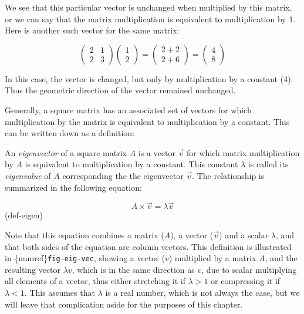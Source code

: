 \documentclass[
  letterpaper,
  DIV=11,
  numbers=noendperiod]{scrreprt}
\begin{document}
We see that this particular vector is unchanged when multiplied by this
matrix, or we can say that the matrix multiplication is equivalent to
multiplication by 1. Here is another such vector for the same matrix:

\[
\left(\begin{array}{cc}2 & 1 \\ 2& 3\end{array}\right)\left(\begin{array}{c}1 \\ 2 \end{array}\right) = \left(\begin{array}{c}2 +2 \\ 2 + 6 \end{array}\right) =  \left(\begin{array}{c} 4 \\ 8 \end{array}\right)
\]

In this case, the vector is changed, but only by multiplication by a
constant (4). Thus the geometric direction of the vector remained
unchanged.

Generally, a square matrix has an associated set of vectors for which
multiplication by the matrix is equivalent to multiplication by a
constant. This can be written down as a definition:

\begin{tcolorbox}[enhanced jigsaw, colbacktitle=quarto-callout-note-color!10!white, leftrule=.75mm, coltitle=black, left=2mm, breakable, opacityback=0, colback=white, toprule=.15mm, opacitybacktitle=0.6, bottomtitle=1mm, colframe=quarto-callout-note-color-frame, rightrule=.15mm, bottomrule=.15mm, toptitle=1mm, titlerule=0mm, arc=.35mm, title=\textcolor{quarto-callout-note-color}{\faInfo}\hspace{0.5em}{Definition}]
An \emph{eigenvector} of a square matrix \(A\) is a vector \(\vec v\)
for which matrix multiplication by \(A\) is equivalent to multiplication
by a constant. This constant \(\lambda\) is called its \emph{eigenvalue}
of \(A\) corresponding the the eigenvector \(\vec v\). The relationship
is summarized in the following equation:

\[
A  \times  \vec v = \lambda \vec v
\] (def-eigen)
\end{tcolorbox}

Note that this equation combines a matrix (\(A\)), a vector (\(\vec v\))
and a scalar \(\lambda\), and that both sides of the equation are column
vectors. This definition is illustrated in
\{numref\}\texttt{fig-eig-vec}, showing a vector (\(v\)) multiplied by a
matrix \(A\), and the resulting vector \(\lambda v\), which is in the
same direction as \(v\), due to scalar multiplying all elements of a
vector, thus either stretching it if \(\lambda>1\) or compressing it if
\(\lambda < 1\). This assumes that \(\lambda\) is a real number, which
is not always the case, but we will leave that complication aside for
the purposes of this chapter.
\end{document}
